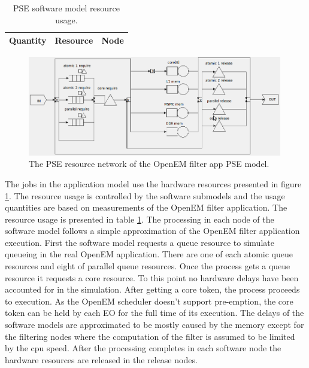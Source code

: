 \begin{table}
    \begin{center}
        \begin{tabular}{| c | c | c |}
            \hline
            Quantity & Resource & Node \\ \hline
        \end{tabular}
        \caption{PSE software model resource usage.}
        \label{tab:pse_resources}
    \end{center}
\end{table}

\begin{figure}[h!]
    \begin{center}
        \includegraphics[width=0.99\textwidth]{images/pse_hardware.png}
        \caption{The PSE resource network of the OpenEM filter app PSE
        model.}
        \label{fig:pse_hardware}
    \end{center}
\end{figure}

The jobs in the application model use the hardware resources presented in figure
\ref{fig:pse_hardware}. The resource usage is controlled by the software
submodels and the usage quantities are based on measurements of the OpenEM
filter application. The resource usage is presented in table
\ref{tab:pse_resources}. The processing in each node of the software model
follows a simple approximation of the OpenEM filter application execution. First
the software model requests a queue resource to simulate queueing in the real
OpenEM application. There are one of each atomic queue resources and eight of
parallel queue resources. Once the process gets a queue resource it requests a
core resource. To this point no hardware delays have been accounted for in the
simulation. After getting a core token, the process proceeds to execution. As
the OpenEM scheduler doesn't support pre-emption, the core token can be held by
each EO for the full time of its execution. The delays of the software models
are approximated to be mostly caused by the memory except for the filtering
nodes where the computation of the filter is assumed to be limited by the cpu
speed. After the processing completes in each software node the hardware
resources are released in the release nodes.

